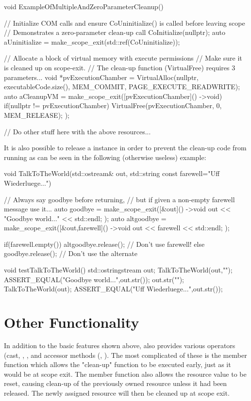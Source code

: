 \documentclass[ebook,11pt,article]{memoir}
\begin{document}
\begin{codeblock}
void ExampleOfMultipleAndZeroParameterCleanup()
{
	// Initialize COM calls and ensure CoUninitialize() is called before leaving scope
	// Demonstrates a zero-parameter clean-up call
	CoInitialize(nullptr);
	auto aUninitialize = make_scope_exit(std::ref(CoUninitialize));

	// Allocate a block of virtual memory with execute permissions
	// Make sure it is cleaned up on scope-exit.  
	// The clean-up function (VirtualFree) requires 3 parameters...
	void *pvExecutionChamber = VirtualAlloc(nullptr, executableCode.size(),
		MEM_COMMIT, 
		PAGE_EXECUTE_READWRITE);
	auto aCleanupVM = make_scope_exit([pvExecutionChamber]() ->void)
	{
		if(nullptr != pvExecutionChamber)
			VirtualFree(pvExecutionChamber, 0, MEM_RELEASE);
	});

	// Do other stuff here with the above resources...
}
\end{codeblock}

It is also possible to release a  instance in order to prevent the clean-up code from running as can be seen in the following (otherwise useless) example:

\begin{codeblock}
void TalkToTheWorld(std::ostream& out, std::string const farewell="Uff Wiederluege...")
{
	// Always say goodbye before returning,
	// but if given a non-empty farewell message use it...
	auto goodbye = make_scope_exit([&out]() ->void
	{
		out << "Goodbye world..." << std::endl;
	});
	auto altgoodbye = make_scope_exit([&out,farewell]() ->void
	{
		out << farewell << std::endl;
	});


	if(farewell.empty())
	{
		altgoodbye.release();		// Don't use farewell!
	}
	else
	{
		goodbye.release();	// Don't use the alternate
	}
}
\end{codeblock}
\begin{codeblock}

void testTalkToTheWorld()
{
	std::ostringstream out;
	TalkToTheWorld(out,"");
	ASSERT_EQUAL("Goodbye world...\n",out.str());
	out.str("");
	TalkToTheWorld(out);
	ASSERT_EQUAL("Uff Wiederluege...\n",out.str());
}
\end{codeblock}

\section{Other Functionality}
In addition to the basic features shown above,  also provides various operators (cast, \tcode{->}, \tcode{()}, and accessor methods (, ).  The most complicated of these is the  member function which allows the "clean-up" function to be executed early, just as it would be at scope exit.  The  member function also allows the resource value to be reset, causing clean-up of the previously owned resource unless it had been released.  The newly assigned resource will then be cleaned up at scope exit.
\end{document}
